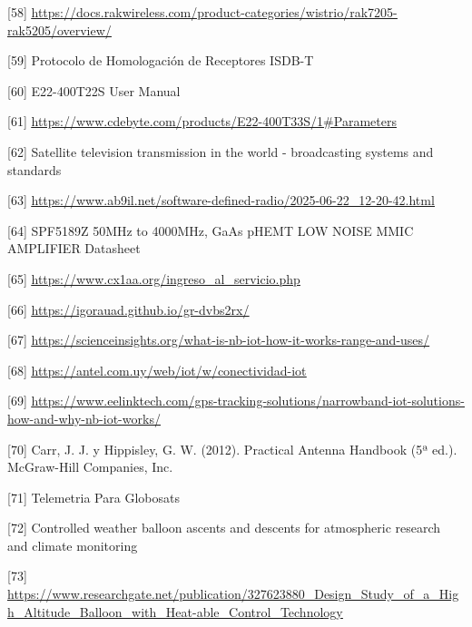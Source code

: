 \documentclass[12pt,a4paper]{article}
\begin{document}
{[}58{]} \href{https://docs.rakwireless.com/product-categories/wistrio/rak7205-rak5205/overview/}{\ul{https://docs.rakwireless.com/product-categories/wistrio/rak7205-rak5205/overview/}}

{[}59{]} Protocolo de Homologación de Receptores ISDB-T

{[}60{]} E22-400T22S User Manual

{[}61{]} \href{https://www.cdebyte.com/products/E22-400T33S/1\#Parameters}{\ul{https://www.cdebyte.com/products/E22-400T33S/1\#Parameters}}

{[}62{]} Satellite television transmission in the world - broadcasting systems and standards

{[}63{]} \href{https://www.ab9il.net/software-defined-radio/2025-06-22_12-20-42.html}{\ul{https://www.ab9il.net/software-defined-radio/2025-06-22\_12-20-42.html}}

{[}64{]} SPF5189Z 50MHz to 4000MHz, GaAs pHEMT LOW NOISE MMIC AMPLIFIER Datasheet

{[}65{]} \href{https://www.cx1aa.org/ingreso_al_servicio.php}{\ul{https://www.cx1aa.org/ingreso\_al\_servicio.php}}

{[}66{]} \href{https://igorauad.github.io/gr-dvbs2rx/}{\ul{https://igorauad.github.io/gr-dvbs2rx/}}

{[}67{]} \href{https://scienceinsights.org/what-is-nb-iot-how-it-works-range-and-uses/}{\ul{https://scienceinsights.org/what-is-nb-iot-how-it-works-range-and-uses/}}

{[}68{]} \href{https://antel.com.uy/web/iot/w/conectividad-iot}{\ul{https://antel.com.uy/web/iot/w/conectividad-iot}}

{[}69{]} \href{https://www.eelinktech.com/gps-tracking-solutions/narrowband-iot-solutions-how-and-why-nb-iot-works/}{\ul{https://www.eelinktech.com/gps-tracking-solutions/narrowband-iot-solutions-how-and-why-nb-iot-works/}}

{[}70{]} Carr, J. J. y Hippisley, G. W. (2012). Practical Antenna Handbook (5ª ed.). McGraw-Hill Companies, Inc.

{[}71{]} Telemetria Para Globosats

{[}72{]} Controlled weather balloon ascents and descents for atmospheric research and climate monitoring

{[}73{]} \href{https://www.researchgate.net/publication/327623880_Design_Study_of_a_High_Altitude_Balloon_with_Heat-able_Control_Technology}{\ul{https://www.researchgate.net/publication/327623880\_Design\_Study\_of\_a\_High\_Altitude\_Balloon\_with\_Heat-able\_Control\_Technology}}
\end{document}
